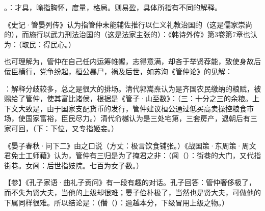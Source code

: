 {
\item {}。：才具，喻指胸怀，度量，格局。则易盈，具体所指有不同的解释。

《史记·管晏列传》认为指管仲未能辅佐推行以仁义礼教治国的（这是儒家崇尚的），而施行以武力刑法治国的（这是法家主张的）：《韩诗外传》第3卷第7章也认为：（取民：得民心。）

也可理解为，管仲在自己任内运筹帷幄，志得意满，却吝于举贤荐能，致使身故后佞臣横行，党争纷起，桓公暴尸，祸及后世，如苏洵《管仲论》的见解：

\item {}：解释分歧较多，总之是很大的排场。清代郭嵩焘认为是齐国农民缴纳的粮赋，被赐给了管仲，使其富比诸侯，根据是《管子·山至数》：（三：十分之三的余粮。上下文大致是，由于国家支配货币的发行，管仲建议桓公通过低买高卖操控粮食市场，使国家富裕，臣民尽力。）清代俞樾认为是三处宅第，三套房产，退朝后有三家可回，（下：下位，又专指姬妾。）

《晏子春秋·问下二》由之口说（方丈：极言饮食铺张。）《战国策·东周策·周文君免士工师藉》认为，管仲有三归是为了掩君之非：（闾（）：街巷的大门，又代指街巷。女闾：后世指妓院。七百为女子数。）

【参】《孔子家语·曲礼子贡问》有一段有趣的对话。孔子回答：管仲奢侈极了，而不失为贤大夫，当他的上级却很难；晏子俭朴极了，当然也是贤大夫，可做他的下属同样很难。所以结论是：（僭（）：逾越本分，下级冒用上级之物。）

}
